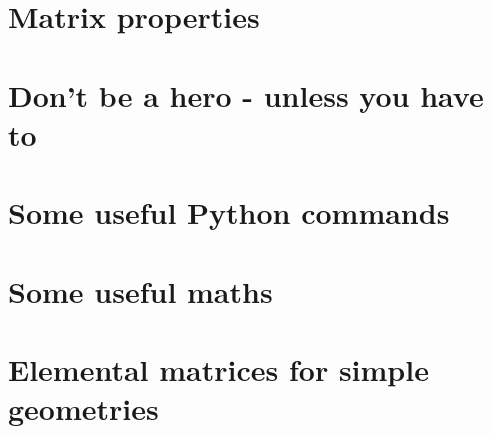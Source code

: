 \documentclass[a4paper,12pt]{report}
\begin{document}
 \label{chapt:viscoelasticity} %

 \label{chapt:geophysical_data} %


\appendix %

\chapter{Matrix properties}  %
\chapter{Don't be a hero - unless you have to}  %
\chapter{Some useful Python commands}  %
\chapter{Some useful maths}  \label{app_maths} %
\chapter{Elemental matrices for simple geometries}\label{app:mm}  %
\end{document}
